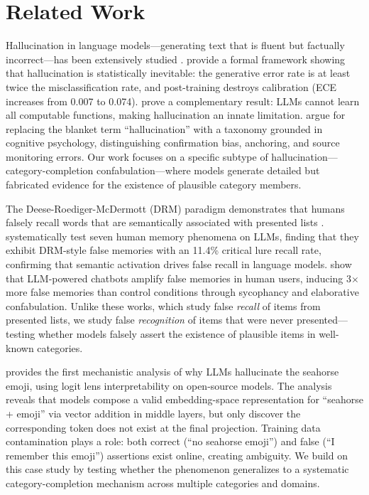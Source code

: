 \section{Related Work}
\label{sec:related}

Hallucination in language models---generating text that is fluent but factually incorrect---has been extensively studied \cite{ji2023survey, zhang2025survey}.
\citet{kalai2025hallucinate} provide a formal framework showing that hallucination is statistically inevitable: the generative error rate is at least twice the misclassification rate, and post-training destroys calibration (ECE increases from 0.007 to 0.074).
\citet{xu2024inevitable} prove a complementary result: LLMs cannot learn all computable functions, making hallucination an innate limitation.
\citet{berberette2024redefining} argue for replacing the blanket term ``hallucination'' with a taxonomy grounded in cognitive psychology, distinguishing confirmation bias, anchoring, and source monitoring errors.
Our work focuses on a specific subtype of hallucination---category-completion confabulation---where models generate detailed but fabricated evidence for the existence of plausible category members.

The Deese-Roediger-McDermott (DRM) paradigm demonstrates that humans falsely recall words that are semantically associated with presented lists \cite{roediger1995creating}.
\citet{cao2025memory} systematically test seven human memory phenomena on LLMs, finding that they exhibit DRM-style false memories with an 11.4\% critical lure recall rate, confirming that semantic activation drives false recall in language models.
\citet{chan2024false} show that LLM-powered chatbots amplify false memories in human users, inducing 3$\times$ more false memories than control conditions through sycophancy and elaborative confabulation.
Unlike these works, which study false \emph{recall} of items from presented lists, we study false \emph{recognition} of items that were never presented---testing whether models falsely assert the existence of plausible items in well-known categories.

\citet{vogel2026seahorse} provides the first mechanistic analysis of why LLMs hallucinate the seahorse emoji, using logit lens interpretability on open-source models.
The analysis reveals that models compose a valid embedding-space representation for ``seahorse + emoji'' via vector addition in middle layers, but only discover the corresponding token does not exist at the final projection.
Training data contamination plays a role: both correct (``no seahorse emoji'') and false (``I remember this emoji'') assertions exist online, creating ambiguity.
We build on this case study by testing whether the phenomenon generalizes to a systematic category-completion mechanism across multiple categories and domains.

